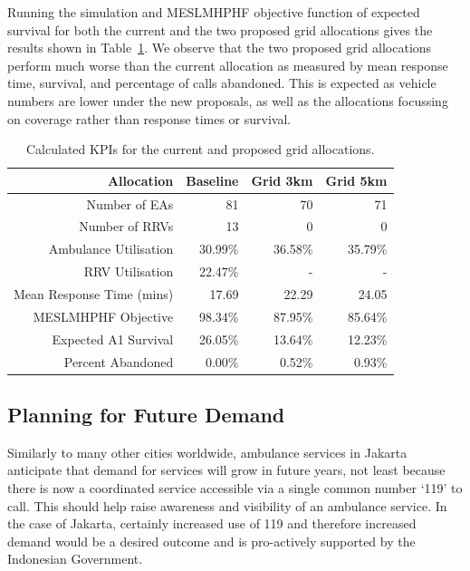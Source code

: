 \documentclass[preprint,12pt]{elsarticle}
\begin{document}
Running the simulation and MESLMHPHF objective function of expected survival for
both the current and the two proposed grid allocations gives the results shown
in Table~\ref{tbl:current_grid_results}. We observe that the two proposed
grid allocations perform much worse than the current allocation as measured by
mean response time, survival, and percentage of calls abandoned.
This is expected as vehicle numbers are lower under the new proposals, as well
as the allocations focussing on coverage rather than response times or survival.

\begin{table}
\begin{center}
\begin{tabular}{rrrr}
\toprule
Allocation & Baseline & Grid 3km & Grid 5km \\
\midrule
Number of EAs & 81 & 70 & 71 \\
Number of RRVs & 13 & 0 & 0 \\
Ambulance Utilisation & 30.99\% & 36.58\% & 35.79\% \\
RRV Utilisation & 22.47\% & - & - \\
Mean Response Time (mins) & 17.69 & 22.29 & 24.05 \\
MESLMHPHF Objective & 98.34\% & 87.95\% & 85.64\% \\
Expected A1 Survival & 26.05\% & 13.64\% & 12.23\% \\
Percent Abandoned & 0.00\% & 0.52\% & 0.93\% \\
\bottomrule
\end{tabular}
\caption{Calculated KPIs for the current and proposed grid allocations.}
\label{tbl:current_grid_results}
\end{center}
\end{table}


\subsection{Planning for Future Demand}\label{sec:demand_scenarios}
Similarly to many other cities worldwide, ambulance services in Jakarta
anticipate that demand for services will grow in future years, not least because
there is now a coordinated service accessible via a single common number `119'
to call. This should help raise awareness and visibility of an ambulance
service. In the case of Jakarta, certainly increased use of 119 and therefore
increased demand would be a desired outcome and is pro-actively supported
by the Indonesian Government. 
\end{document}

